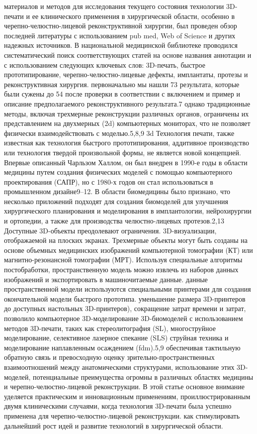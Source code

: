 материалов и методов
для исследования текущего состояния технологии 3D-печати и
ее клинического применения в хирургической области, особенно в
черепно-челюстно-лицевой реконструктивной хирургии, был проведен обзор последней
литературы с использованием pub med, Web of Science и других надежных
источников. В национальной медицинской библиотеке проводился систематический
поиск соответствующих статей на основе названия аннотации и с использованием
следующих ключевых слов: 3D-печать, быстрое прототипирование,
черепно-челюстно-лицевые дефекты, имплантаты, протезы и реконструктивная
хирургия. первоначально мы нашли 73 результата, которые были сужены до 54 после
проверки в соответствии с включением и
пример и описание предполагаемого реконструктивного результата.7 однако
традиционные методы, включая трехмерные реконструкции различных органов,
ограничены их представлением на двухмерных (2d) компьютерных мониторах, что не
позволяет физически взаимодействовать с моделью.5,8,9 3d Технология печати,
также известная как технология быстрого прототипирования, аддитивное
производство или технология твердой произвольной формы, не является новой
концепцией. Впервые описанный Чарльзом Халлом, он был внедрен в 1990-е годы в
области медицины путем создания физических моделей с помощью компьютерного
проектирования (САПР), но с 1980-х годов он стал использоваться в промышленном
дизайне9–12. В области биомедицины было признано, что несколько приложений
подходят для создания биомоделей для улучшения хирургического планирования и
моделирования в имплантологии, нейрохирургии и ортопедии, а также для
производства челюстно-лицевых протезов.2,13 Доступные 3D-объекты преодолевают
ограничения. 3D-визуализации, отображаемой на плоских экранах. Трехмерные
объекты могут быть созданы на основе объемных медицинских изображений
компьютерной томографии (КТ) или магнитно-резонансной томографии (МРТ).
Используя специальные алгоритмы постобработки, пространственную модель можно
извлечь из наборов данных изображений и экспортировать в машиночитаемые данные.
данные пространственной модели используются специальными принтерами для создания
окончательной модели быстрого прототипа. уменьшение размера 3D-принтеров до
доступных настольных 3D-принтеров), сокращение затрат времени и затрат,
позволило компьютерное 3D-моделирование 3D-биомоделей с использованием методов
3D-печати, таких как стереолитография (SL), многоструйное моделирование,
селективное лазерное спекание (SLS) струйная техника и моделирование
наплавленным осаждением (fdm).5,9 обеспечивая тактильную обратную связь и
превосходную оценку зрительно-пространственных взаимоотношений между
анатомическими структурами, использование этих 3D-моделей, потенциальные
преимущества огромны в различных областях медицины и черепно-челюстно-лицевой
реконструкции. В этой статье основное внимание уделяется практическим и
инновационным применениям, проиллюстрированным двумя клиническими случаями,
когда технология 3D-печати была успешно применена для черепно-челюстно-лицевой
реконструкции. как стимулировать дальнейший рост идей и развитие технологий в
хирургической области.


